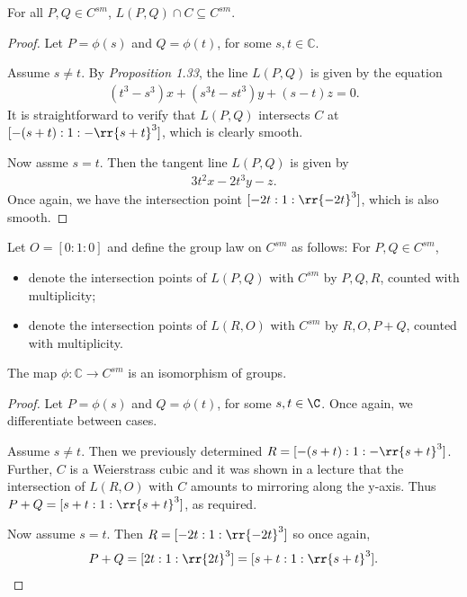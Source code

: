 \documentclass{article}
\begin{document}
\begin{claim*}[2]
  For all $P,Q\in C^{sm}$, $L(P,Q)\cap C \subseteq C^{sm}$.
  \begin{proof}
    Let $P=\phi(s)$ and $Q=\phi(t)$, for some $s,t\in\mathbb C$.

    Assume $s\neq t$. By \emph{Proposition 1.33}, the line $L(P,Q)$ is given by the equation
    \begin{align*}
      (t^3-s^3)x + (s^3t-st^3)y + (s-t)z = 0.
    \end{align*}
    It is straightforward to verify that $L(P,Q)$ intersects $C$ at $[-(s+t) : 1 : -\rr{s+t}^3]$,
    which is clearly smooth.

    Now assme $s=t$. Then the tangent line $L(P,Q)$ is given by
    \begin{align*}
      3t^2 x - 2t^3 y - z.
    \end{align*}
    Once again, we have the intersection point $[-2t:1:\rr{-2t}^3]$, which is also smooth.
  \end{proof}
\end{claim*}

Let $O=[0:1:0]$ and define the group law on $C^{sm}$ as follows: For $P,Q\in C^{sm}$,
\begin{itemize}
  \item denote the intersection points of $L(P,Q)$ with $C^{sm}$ by $P,Q,R$, counted with multiplicity;
  \item denote the intersection points of $L(R,O)$ with $C^{sm}$ by $R,O,P+Q$, counted with multiplicity.
\end{itemize}

\begin{claim*}[3]
  The map $\phi:\mathbb C\to C^{sm}$ is an isomorphism of groups.
  \begin{proof}
    Let $P=\phi(s)$ and $Q=\phi(t)$, for some $s,t\in\C$. Once again, we differentiate
    between cases.

    Assume $s\neq t$. Then we previously determined $R=[-(s+t) : 1 : -\rr{s+t}^3]$. Further,
    $C$ is a Weierstrass cubic and it was shown in a lecture that the intersection of $L(R,O)$
    with $C$ amounts to mirroring along the y-axis. Thus $P+Q=[s+t : 1 : \rr{s+t}^3]$,
    as required.

    Now assume $s=t$. Then $R=[-2t:1:\rr{-2t}^3]$ so once again,
    \begin{align*}
      P+Q=[2t:1:\rr{2t}^3]=[s+t : 1 : \rr{s+t}^3].
    \end{align*}
  \end{proof}
\end{claim*}
\end{document}
